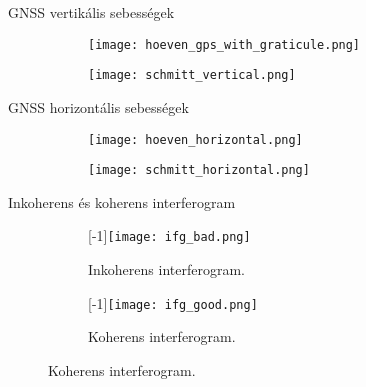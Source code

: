 \documentclass[14pt, aspectratio=169]{beamer}
\begin{document}
\begin{frame}{GNSS vertikális sebességek}
    \begin{center}
        \begin{figure}
            \begin{subfigure}[t]{.40\linewidth}
                \centering
                \texttt{[image: hoeven\_gps\_with\_graticule.png]}
            \end{subfigure}
            \begin{subfigure}[t]{.40\linewidth}
                \centering
                \texttt{[image: schmitt\_vertical.png]}
            \end{subfigure}
        \end{figure}
    \end{center}
\end{frame}


\begin{frame}{GNSS horizontális sebességek}
    \begin{center}
        \begin{figure}
            \begin{subfigure}[t]{.4\linewidth}
                \centering
                \texttt{[image: hoeven\_horizontal.png]}
            \end{subfigure}
            \begin{subfigure}[t]{.4\linewidth}
                \centering
                \texttt{[image: schmitt\_horizontal.png]}
            \end{subfigure}
        \end{figure}
    \end{center}
\end{frame}


\begin{frame}{Inkoherens és koherens interferogram}
    \begin{center}
        \begin{figure}
            \begin{subfigure}[t]{.4\linewidth}
                \centering
                \scalebox{1}[-1]{\texttt{[image: ifg\_bad.png]}}
                \caption{Inkoherens interferogram.}
            \end{subfigure}
            \begin{subfigure}[t]{.4\linewidth}
                \centering
                \scalebox{1}[-1]{\texttt{[image: ifg\_good.png]}}
                \caption{Koherens interferogram.}
            \end{subfigure}
        \end{figure}
    \end{center}
\end{frame}
\end{document}
